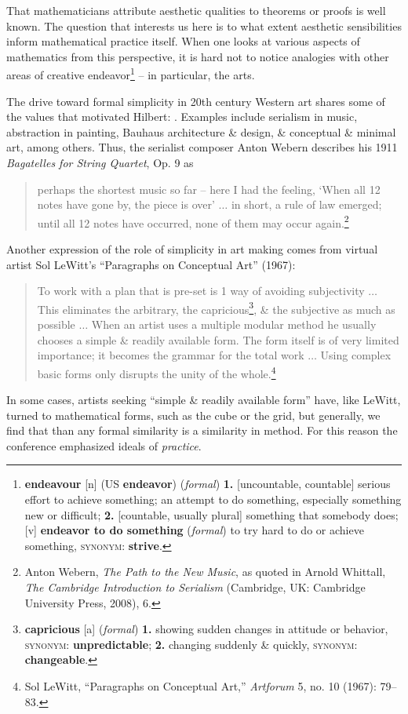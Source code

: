 \documentclass[oneside]{book}
\numberwithin{equation}{section}
\begin{document}
That mathematicians attribute aesthetic qualities to theorems or proofs is well known. The question that interests us here is to what extent aesthetic sensibilities inform mathematical practice itself. When one looks at various aspects of mathematics from this perspective, it is hard not to notice analogies with other areas of creative endeavor\footnote{\textbf{endeavour} [n] (US \textbf{endeavor}) (\textit{formal}) \textbf{1.} [uncountable, countable] serious effort to achieve something; an attempt to do something, especially something new or difficult; \textbf{2.} [countable, usually plural] something that somebody does; [v]  \textbf{endeavor to do something} (\textit{formal}) to try hard to do or achieve something, \textsc{synonym}: \textbf{strive}.} -- in particular, the arts.

The drive toward formal simplicity in 20th century Western art shares some of the values that motivated Hilbert: . Examples include serialism in music, abstraction in painting, Bauhaus architecture \& design, \& conceptual \& minimal art, among others. Thus, the serialist composer Anton Webern describes his 1911 \textit{Bagatelles for String Quartet}, Op. 9 as
\begin{quotation}
	perhaps the shortest  music so far -- here I had the feeling, `When all 12 notes have gone by, the piece is over' $\ldots$ in short, a rule of law emerged; until all 12 notes have occurred, none of them may occur again.\footnote{Anton Webern, \textit{The Path to the New Music}, as quoted in Arnold Whittall, \textit{The Cambridge Introduction to Serialism} (Cambridge, UK: Cambridge University Press, 2008), 6.}
\end{quotation}
Another expression of the role of simplicity in art making comes from virtual artist Sol LeWitt's ``Paragraphs on Conceptual Art'' (1967):
\begin{quotation}
	To work with a plan that is pre-set is 1 way of avoiding subjectivity $\ldots$ This eliminates the arbitrary, the capricious\footnote{\textbf{capricious} [a] (\textit{formal}) \textbf{1.} showing sudden changes in attitude or behavior, \textsc{synonym}: \textbf{unpredictable}; \textbf{2.} changing suddenly \& quickly, \textsc{synonym}: \textbf{changeable}.}, \& the subjective as much as possible $\ldots$ When an artist uses a multiple modular method he usually chooses a simple \& readily available form. The form itself is of very limited importance; it becomes the grammar for the total work $\ldots$ Using complex basic forms only disrupts the unity of the whole.\footnote{Sol LeWitt, ``Paragraphs on Conceptual Art,'' \textit{Artforum} 5, no. 10 (1967): 79--83.}
\end{quotation}
In some cases, artists seeking ``simple \& readily available form'' have, like LeWitt, turned to mathematical forms, such as the cube or the grid, but generally, we find that  than any formal similarity is a similarity in method. For this reason the conference emphasized ideals of \textit{practice}.
\end{document}
